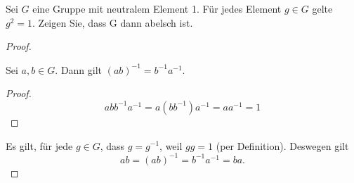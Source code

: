 \begin{Problem}
	Sei $G$ eine Gruppe mit neutralem Element 1. Für jedes Element $g \in G$ gelte $g^2 = 1$. Zeigen Sie, dass G dann abelsch ist.
\end{Problem}

\begin{proof}
\begin{Lemma}
	Sei $a,b\in G$. Dann gilt $(ab)^{-1}=b^{-1}a^{-1}$.
\end{Lemma}
\begin{proof}
	\[abb^{-1}a^{-1}=a(bb^{-1})a^{-1}=aa^{-1}=1\]
\end{proof}
Es gilt, f\"{u}r jede $g\in G$, dass $g=g^{-1}$, weil $gg=1$ (per Definition). Deswegen gilt
\[
ab=(ab)^{-1}=b^{-1}a^{-1}=ba
.\] 
\end{proof}


